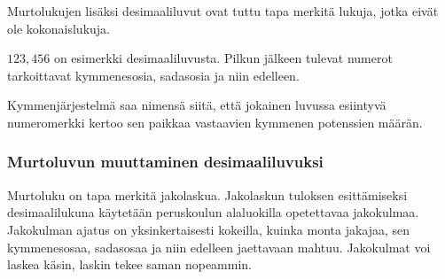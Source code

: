 Murtolukujen lisäksi desimaaliluvut ovat tuttu tapa merkitä lukuja, jotka eivät ole kokonaislukuja.

$123,456$ on esimerkki desimaaliluvusta. Pilkun jälkeen tulevat numerot tarkoittavat kymmenesosia, sadasosia ja niin edelleen.



Kymmenjärjestelmä saa nimensä siitä, että jokainen luvussa esiintyvä numeromerkki kertoo sen paikkaa vastaavien kymmenen potenssien määrän.

\subsubsection*{Murtoluvun muuttaminen desimaaliluvuksi}

Murtoluku on tapa merkitä jakolaskua. Jakolaskun tuloksen esittämiseksi desimaalilukuna käytetään peruskoulun alaluokilla opetettavaa jakokulmaa. Jakokulman ajatus on yksinkertaisesti kokeilla, kuinka monta jakajaa, sen kymmenesosaa, sadasosaa ja niin edelleen jaettavaan mahtuu. Jakokulmat voi laskea käsin, laskin tekee saman nopeammin.

